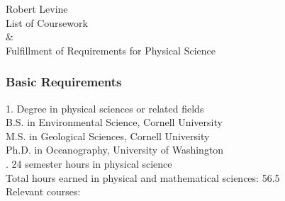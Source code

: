 \documentclass[12pt,a4paper]{article}
\begin{document}
\begin{center}
{\Large Robert Levine} 
\medskip\\
List of Coursework\\ \& \\ Fulfillment of Requirements for Physical Science
\end{center}
\subsubsection*{Basic Requirements}

1. Degree in physical sciences or related fields
\medskip\\ B.S. in Environmental Science, Cornell University\\
M.S. in Geological Sciences, Cornell University\\
Ph.D. in Oceanography, University of Washington\\

. 24 semester hours in physical science %
\medskip\\
Total hours earned in physical and mathematical sciences: 56.5
\medskip\\
Relevant courses:\\

\end{document}
